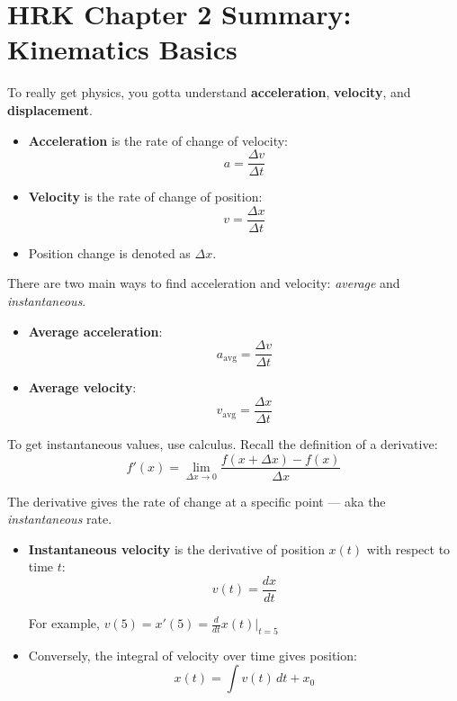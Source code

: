 \documentclass{article}
\begin{document}
\section*{HRK Chapter 2 Summary: Kinematics Basics}

To really get physics, you gotta understand \textbf{acceleration}, \textbf{velocity}, and \textbf{displacement}.

\begin{itemize}
    \item \textbf{Acceleration} is the rate of change of velocity:
    \[
    a = \frac{\Delta v}{\Delta t}
    \]
    
    \item \textbf{Velocity} is the rate of change of position:
    \[
    v = \frac{\Delta x}{\Delta t}
    \]
    
    \item Position change is denoted as $\Delta x$.
\end{itemize}

\vspace{2mm}

There are two main ways to find acceleration and velocity: \textit{average} and \textit{instantaneous}.

\begin{itemize}
    \item \textbf{Average acceleration}:
    \[
    a_{\text{avg}} = \frac{\Delta v}{\Delta t}
    \]
    
    \item \textbf{Average velocity}:
    \[
    v_{\text{avg}} = \frac{\Delta x}{\Delta t}
    \]
\end{itemize}

\vspace{2mm}

To get instantaneous values, use calculus. Recall the definition of a derivative:
\[
f'(x) = \lim_{\Delta x \to 0} \frac{f(x+\Delta x) - f(x)}{\Delta x}
\]

The derivative gives the rate of change at a specific point — aka the \textit{instantaneous} rate.

\begin{itemize}
    \item \textbf{Instantaneous velocity} is the derivative of position $x(t)$ with respect to time $t$:
    \[
    v(t) = \frac{dx}{dt}
    \]
    
    For example, $v(5) = x'(5) = \frac{d}{dt}x(t) \big|_{t=5}$
    
    \item Conversely, the integral of velocity over time gives position:
    \[
    x(t) = \int v(t) \, dt + x_0
    \]
\end{itemize}
\end{document}
